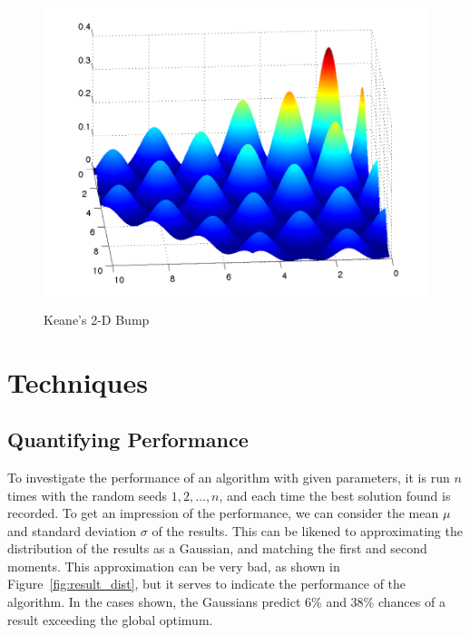 \documentclass[10pt]{article}
\begin{document}
\begin{figure}[tbp]
  \begin{center}
    \includegraphics[height=9cm]{bump_3d_smooth.pdf}
    \end{center}
    \caption{Keane's 2-D Bump}
    \label{fig:bump_3d}
    \end{figure}

\section{Techniques}

\subsection{Quantifying Performance}

\label{sec:quant_perf}

To investigate the performance of an algorithm with given parameters, it is
run $n$ times with the random seeds $1, 2, \dots, n$, and each time the best
solution found is recorded. To get an impression of the performance, we can
consider the mean $\mu$ and standard deviation $\sigma$ of the results. This
can be likened to approximating the distribution of the results as a Gaussian,
and matching the first and second moments. This approximation can be very bad,
as shown in Figure~\ref{fig:result_dist}, but it serves to indicate the
performance of the algorithm. In the cases shown, the Gaussians predict 6\%
and 38\% chances of a result exceeding the global optimum.
\end{document}
